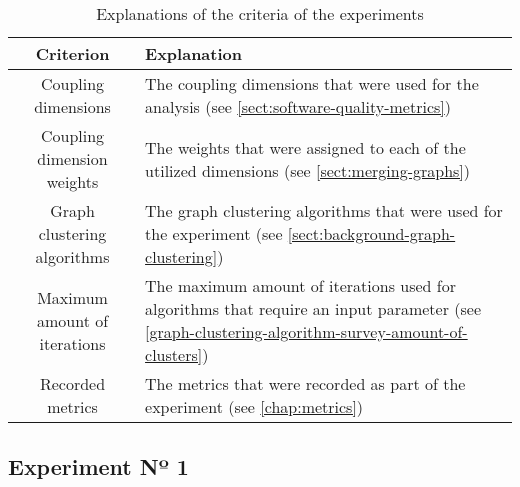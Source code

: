 \documentclass[12pt,a4paper]{report}
\begin{document}
\begin{table}[ht!]
\def\arraystretch{1.55}
\begin{tabularx}{\textwidth}{|c|X|}
\hline
Criterion & Explanation \\
\hline\hline

Coupling dimensions            & The coupling dimensions that were used for the analysis (see \ref{sect:software-quality-metrics}) \\\hline

Coupling dimension weights     & The weights that were assigned to each of the utilized dimensions (see \ref{sect:merging-graphs}) \\\hline

Graph clustering algorithms    & The graph clustering algorithms that were used for the experiment (see \ref{sect:background-graph-clustering}) \\\hline

Maximum amount of iterations   & The maximum amount of iterations used for algorithms that require an input parameter (see \ref{graph-clustering-algorithm-survey-amount-of-clusters}) \\\hline

Recorded metrics               & The metrics that were recorded as part of the experiment (see \ref{chap:metrics}) \\\hline

\end{tabularx}
\caption{Explanations of the criteria of the experiments}
\label{table:experiment-criteria}
\end{table}


\subsection{Experiment Nº 1}
\end{document}
